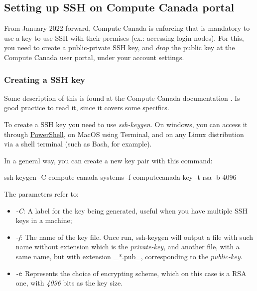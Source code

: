 \documentclass[
]{book}
\newenvironment{Shaded}{\begin{snugshade}}{\end{snugshade}}
\newcommand{\AttributeTok}[1]{\textcolor[rgb]{0.77,0.63,0.00}{#1}}
\newcommand{\FunctionTok}[1]{\textcolor[rgb]{0.00,0.00,0.00}{#1}}
\newcommand{\NormalTok}[1]{#1}
\newcommand{\StringTok}[1]{\textcolor[rgb]{0.31,0.60,0.02}{#1}}
\providecommand{\tightlist}{%
  \setlength{\itemsep}{0pt}\setlength{\parskip}{0pt}}
\begin{document}
\hypertarget{setting-up-ssh-on-compute-canada-portal}{%
\subsection{Setting up SSH on Compute Canada portal}\label{setting-up-ssh-on-compute-canada-portal}}

From January 2022 forward, Compute Canada is enforcing that is mandatory to use
a key to use SSH with their premises (ex.: accessing login nodes). For this, you
need to create a public-private SSH key, and \emph{drop} the public key at the
Compute Canada user portal, under your account settings.

\hypertarget{creating-a-ssh-key}{%
\subsubsection{Creating a SSH key}\label{creating-a-ssh-key}}

Some description of this is found at the Compute Canada documentation \citet{CC_ssh_key} .
Is good practice to read it, since it covers some specifics.

To create a SSH key you need to use \emph{ssh-keygen}. On windows, you can access it
through \href{https://docs.microsoft.com/en-us/windows-server/administration/openssh/openssh_keymanagement\#user-key-generation}{PowerShell}, on MacOS using Terminal, and on any Linux
distribution via a shell terminal (such as Bash, for example).

In a general way, you can create a new key pair with this command:

\begin{Shaded}
\begin{Highlighting}[]
\FunctionTok{ssh{-}keygen} \AttributeTok{{-}C} \StringTok{\textquotesingle{}compute canada systems\textquotesingle{}} \AttributeTok{{-}f}\NormalTok{ computecanada{-}key }\AttributeTok{{-}t}\NormalTok{ rsa }\AttributeTok{{-}b}\NormalTok{ 4096}
\end{Highlighting}
\end{Shaded}

The parameters refer to:

\begin{itemize}
\tightlist
\item
  \emph{-C}: A label for the key being generated, useful when you have multiple SSH
  keys in a machine;
\item
  \emph{-f}: The name of the key file. Once run, ssh-keygen will output a file with
  such name without extension which is the \emph{private-key}, and another file, with a
  same name, but with extension \_*.pub\_, corresponding to the \emph{public-key}.
\item
  \emph{-t}: Represents the choice of encrypting scheme, which on this case is a RSA
  one, with \emph{4096} bits as the key size.
\end{itemize}
\end{document}
